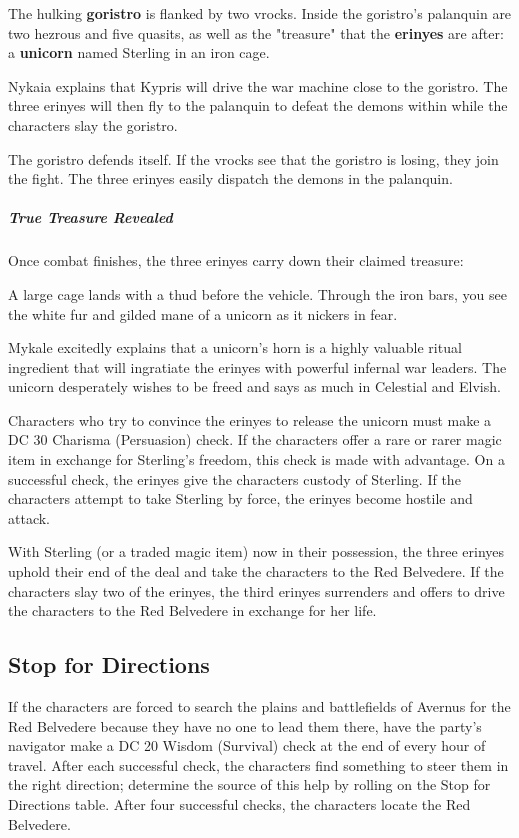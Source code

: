 \documentclass[10pt,a4paper,twoside,bg=print,twocolumn,openany,nodeprecatedcode]{dndbook}
\begin{document}
The hulking \textbf{goristro} is flanked by two vrocks. Inside the goristro's palanquin are two hezrous and five quasits, as well as the "treasure" that the \textbf{erinyes} are after: a \textbf{unicorn} named Sterling in an iron cage.

Nykaia explains that Kypris will drive the war machine close to the goristro. The three erinyes will then fly to the palanquin to defeat the demons within while the characters slay the goristro.

The goristro defends itself. If the vrocks see that the goristro is losing, they join the fight. The three erinyes easily dispatch the demons in the palanquin.

\subparagraph{True Treasure Revealed}
Once combat finishes, the three erinyes carry down their claimed treasure:

\begin{DndReadAloud}{}
A large cage lands with a thud before the vehicle. Through the iron bars, you see the white fur and gilded mane of a unicorn as it nickers in fear.

\end{DndReadAloud}

Mykale excitedly explains that a unicorn's horn is a highly valuable ritual ingredient that will ingratiate the erinyes with powerful infernal war leaders. The unicorn desperately wishes to be freed and says as much in Celestial and Elvish.

Characters who try to convince the erinyes to release the unicorn must make a DC 30 Charisma (Persuasion) check. If the characters offer a rare or rarer magic item in exchange for Sterling's freedom, this check is made with advantage. On a successful check, the erinyes give the characters custody of Sterling. If the characters attempt to take Sterling by force, the erinyes become hostile and attack.

With Sterling (or a traded magic item) now in their possession, the three erinyes uphold their end of the deal and take the characters to the Red Belvedere. If the characters slay two of the erinyes, the third erinyes surrenders and offers to drive the characters to the Red Belvedere in exchange for her life.

\subsection{Stop for Directions}
If the characters are forced to search the plains and battlefields of Avernus for the Red Belvedere because they have no one to lead them there, have the party's navigator make a DC 20 Wisdom (Survival) check at the end of every hour of travel. After each successful check, the characters find something to steer them in the right direction; determine the source of this help by rolling on the Stop for Directions table. After four successful checks, the characters locate the Red Belvedere.
\end{document}
